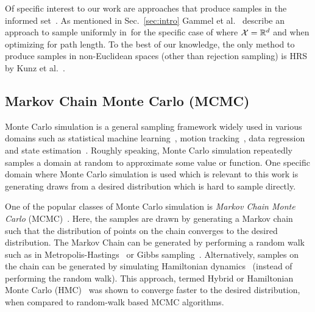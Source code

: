 \documentclass[letterpaper, 10 pt, conference]{ieeeconf}  %
\begin{document}
Of specific interest to our work are approaches that produce samples in the informed set~\Cinf.
As mentioned in Sec.~\ref{sec:intro} Gammel et al.~\cite{GSB14} describe an approach to sample uniformly in~\Cinf for the specific case of where $\mathcal{X} = \mathbb{R}^d$ and when optimizing for path length.
To the best of our knowledge, the only method to produce samples in non-Euclidean spaces (other than rejection sampling) is HRS by Kunz et al.~\cite{KTC16}.

\subsection{Markov Chain Monte Carlo (MCMC)}
\label{subsec:mcmc}
Monte Carlo simulation is a general sampling framework widely used in various domains such as
statistical machine learning~\cite{M97},
motion tracking~\cite{KBD04}, 
data regression~\cite{TL11} and 
state estimation~\cite{ASC13}.
Roughly speaking, Monte Carlo simulation repeatedly samples a domain at random to approximate some value or function.
One specific domain where Monte Carlo simulation is used which is relevant to this work is generating draws from a desired distribution which is hard to sample directly.

One of the popular classes of Monte Carlo simulation is 
\emph{Markov Chain Monte Carlo} (MCMC)~\cite{ADDJ03}.
Here, the samples are drawn by generating a Markov chain such that the distribution of points on the chain converges to the desired distribution.
The Markov Chain can be generated by performing a random walk such as
in Metropolis-Hastings~\cite{CG95} or Gibbs sampling~\cite{CK94}.
Alternatively, samples on the chain can be generated by simulating Hamiltonian dynamics~\cite{N94} (instead of performing the random walk).
This approach, termed Hybrid or Hamiltonian Monte Carlo (HMC)~\cite{N11} was shown to converge faster to the desired distribution, when compared to random-walk based MCMC algorithms.
\end{document}

